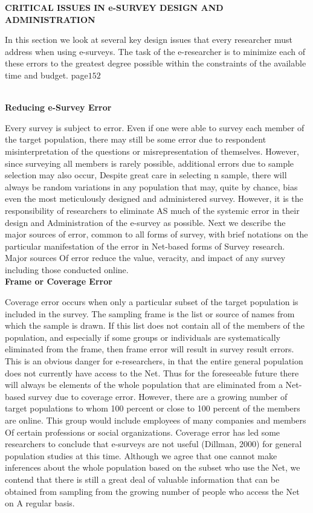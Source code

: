 \documentclass{book}
\begin{document}
\textbf{CRITICAL ISSUES IN e-SURVEY DESIGN AND ADMINISTRATION}\par  In this section we look at several key design issues that every researcher must address when using e-surveys. The task of the e-researcher is to minimize each of these errors to the greatest degree possible within the constraints of the available time and budget.\newpage
page$152$\\\\\par
\textbf{Reducing e-Survey Error}\par  Every survey is subject to error. Even if one were able to survey each member of the target population, there may still be some error due to respondent misinterpretation of the questions or misrepresentation of themselves. However, since surveying all members is rarely possible, additional errors due to sample selection may also occur, Despite great care in selecting n sample, there will always be random variations in any population that may, quite by chance, bias even the most meticulously designed and administered survey. However, it is the responsibility of researchers to eliminate AS much of the systemic error in their design and Administration of the e-survey as possible. Next we describe the major sources of error, common to all forms of survey, with brief notations on the particular manifestation of the error in Net-based forms of Survey research. Major sources Of error reduce the value, veracity, and impact of any survey including those conducted online.\\
\textbf{Frame or Coverage Error}\par  Coverage error occurs when only a particular subset of the target population is included in the survey. The sampling frame is the list or source of names from which the sample is drawn. If this list does not contain all of the members of the population, and especially if some groups or individuals are systematically eliminated from the frame, then frame error will result in survey result errors. This is an obvious danger for e-researchers, in that the entire general population does not currently have access to the Net. Thus for the foreseeable future there will always be elements of the whole population that are eliminated from a Net-based survey due to coverage error. However, there are a growing number of target populations to whom 100 percent or close to 100 percent of the members are online. This group would include employees of many companies and members Of certain professions or social organizations. Coverage error has led some researchers to conclude that e-surveys are not useful (Dillman, 2000) for general population studies at this time. Although we agree that one cannot make inferences about the whole population based on the subset who use the Net, we contend that there is still a great deal of valuable information that can be obtained from sampling from the growing number of people who access the Net on A regular basis.\\
\end{document}
